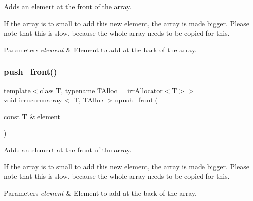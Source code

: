 Adds an element at the front of the array. 

If the array is to small to add this new element, the array is made bigger. Please note that this is slow, because the whole array needs to be copied for this. 
\begin{DoxyParams}{Parameters}
{\em element} & Element to add at the back of the array. \\
\hline
\end{DoxyParams}
\mbox{\label{classirr_1_1core_1_1array_a31b686ce4b1ebae930f22bc40d30efbd}} 
\subsubsection{\texorpdfstring{push\+\_\+front()}{push\_front()}\hspace{0.1cm}{\footnotesize\ttfamily [2/2]}}
{\footnotesize\ttfamily template$<$class T, typename T\+Alloc = irr\+Allocator$<$\+T$>$$>$ \\
void \hyperlink{classirr_1_1core_1_1array}{irr\+::core\+::array}$<$ T, T\+Alloc $>$\+::push\+\_\+front (\begin{DoxyParamCaption}\item[{const T \&}]{element }\end{DoxyParamCaption})\hspace{0.3cm}{\ttfamily [inline]}}



Adds an element at the front of the array. 

If the array is to small to add this new element, the array is made bigger. Please note that this is slow, because the whole array needs to be copied for this. 
\begin{DoxyParams}{Parameters}
{\em element} & Element to add at the back of the array. \\
\hline
\end{DoxyParams}
\mbox{\label{classirr_1_1core_1_1array_ada5735f409eca82b9031d993ee8b31c3}} 
